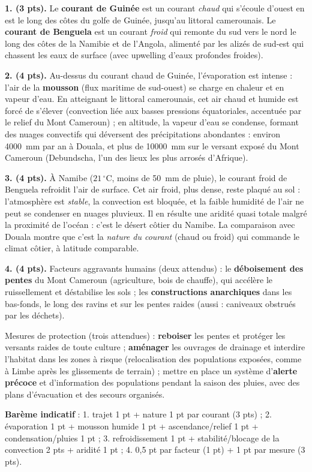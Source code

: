\documentclass[11pt]{article}
\begin{document}
\begin{corrige}
\textbf{1. (3 pts).} Le \textbf{courant de Guinée} est un courant \emph{chaud} qui s'écoule d'ouest en est le long des côtes du golfe de Guinée, jusqu'au littoral camerounais. Le \textbf{courant de Benguela} est un courant \emph{froid} qui remonte du sud vers le nord le long des côtes de la Namibie et de l'Angola, alimenté par les alizés de sud-est qui chassent les eaux de surface (avec upwelling d'eaux profondes froides).

\textbf{2. (4 pts).} Au-dessus du courant chaud de Guinée, l'évaporation est intense : l'air de la \textbf{mousson} (flux maritime de sud-ouest) se charge en chaleur et en vapeur d'eau. En atteignant le littoral camerounais, cet air chaud et humide est forcé de s'élever (convection liée aux basses pressions équatoriales, accentuée par le relief du Mont Cameroun) ; en altitude, la vapeur d'eau se condense, formant des nuages convectifs qui déversent des précipitations abondantes : environ \SI{4000}{mm} par an à Douala, et plus de \SI{10000}{mm} sur le versant exposé du Mont Cameroun (Debundscha, l'un des lieux les plus arrosés d'Afrique).

\textbf{3. (4 pts).} À Namibe ($21\,^\circ$C, moins de \SI{50}{mm} de pluie), le courant froid de Benguela refroidit l'air de surface. Cet air froid, plus dense, reste plaqué au sol : l'atmosphère est \emph{stable}, la convection est bloquée, et la faible humidité de l'air ne peut se condenser en nuages pluvieux. Il en résulte une aridité quasi totale malgré la proximité de l'océan : c'est le désert côtier du Namibe. La comparaison avec Douala montre que c'est la \emph{nature du courant} (chaud ou froid) qui commande le climat côtier, à latitude comparable.

\textbf{4. (4 pts).} Facteurs aggravants humains (deux attendus) : le \textbf{déboisement des pentes} du Mont Cameroun (agriculture, bois de chauffe), qui accélère le ruissellement et déstabilise les sols ; les \textbf{constructions anarchiques} dans les bas-fonds, le long des ravins et sur les pentes raides (aussi : caniveaux obstrués par les déchets).

Mesures de protection (trois attendues) : \textbf{reboiser} les pentes et protéger les versants raides de toute culture ; \textbf{aménager} les ouvrages de drainage et interdire l'habitat dans les zones à risque (relocalisation des populations exposées, comme à Limbe après les glissements de terrain) ; mettre en place un système d'\textbf{alerte précoce} et d'information des populations pendant la saison des pluies, avec des plans d'évacuation et des secours organisés.

\textbf{Barème indicatif} : 1. trajet 1 pt + nature 1 pt par courant (3 pts) ; 2. évaporation 1 pt + mousson humide 1 pt + ascendance/relief 1 pt + condensation/pluies 1 pt ; 3. refroidissement 1 pt + stabilité/blocage de la convection 2 pts + aridité 1 pt ; 4. 0,5 pt par facteur (1 pt) + 1 pt par mesure (3 pts).
\end{corrige}
\end{document}
